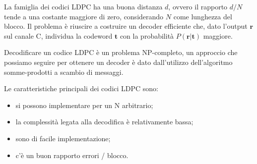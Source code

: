 \documentclass{article}
\begin{document}
	La famiglia dei codici LDPC ha una buona distanza $d$, ovvero il rapporto $d/N$ tende a una costante maggiore di zero, considerando $N$ come lunghezza del blocco. Il problema è riuscire a costruire un decoder efficiente che, dato l'output $\textbf{r}$ sul canale C, individua la codeword $\textbf{t}$ con la probabilità $P(\textbf{r}|\textbf{t})$ maggiore. 

Decodificare un codice LDPC è un problema NP-completo, un approccio che possiamo seguire per ottenere un decoder è dato dall'utilizzo dell'algoritmo somme-prodotti a scambio di messaggi.

	Le caratteristiche principali dei codici LDPC sono: 
	\begin{itemize}
		\item si possono implementare per un N arbitrario;
		\item la complessità legata alla decodifica è relativamente bassa;
		\item sono di facile implementazione;
		\item c'è un buon rapporto errori / blocco.
	\end{itemize}
\end{document}
